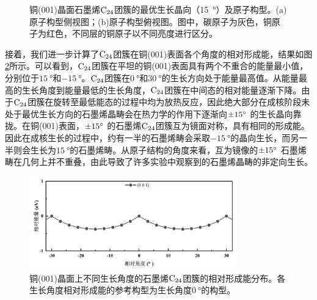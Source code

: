 \begin{figure}[htb]

    \caption{铜(001)晶面石墨烯$\rm{C_{24}}$团簇的最优生长晶向（\SI{15}{\degree}）及原子构型。(a)原子构型侧视图；(b)原子构型俯视图。图中，碳原子为灰色，铜原子为红色，不同层的铜原子以不同亮度进行区分。}
    \label{fig:GO_001_15_structure}
\end{figure}

接着，我们进一步计算了$\rm{C_{24}}$团簇在铜(001)表面各个角度的相对形成能，结果如图\ref{fig:GO_001_energy}所示。可以看到，$\rm{C_{24}}$团簇在平坦的铜(001)表面具有两个不重合的能量最小值，分别位于$\SI{+15}{\degree}$和$\SI{-15}{\degree}$。$\rm{C_{24}}$团簇在$\SI{0}{\degree}$和$\SI{30}{\degree}$的生长方向处于能量最高值。从能量最高的生长角度到能量最低的生长角度，$\rm{C_{24}}$团簇在中间态的相对能量逐渐下降。由于$\rm{C_{24}}$团簇在旋转至最低能态的过程中均为放热反应，因此绝大部分在成核阶段未处于最优生长方向的石墨烯晶畴会在热力学的作用下逐渐向$\SI{\pm 15}{\degree}$ 的生长晶向靠拢。在铜(001)表面，$\SI{\pm 15}{\degree}$ 的石墨烯$\rm{C_{24}}$团簇互为镜面对称，具有相同的形成能。因此在成核生长的过程中，约有一半的石墨烯畴会采取$\SI{-15}{\degree}$的晶向生长，而另一半则会生长为$\SI{+15}{\degree}$的石墨烯畴。从原子结构的角度来看，互为镜像的$\SI{\pm 15}{\degree}$ 石墨烯畴在几何上并不重叠，由此导致了许多实验中观察到的石墨烯晶畴的非定向生长。

\begin{figure}[htb]
    \includegraphics[width=0.8\textwidth]{pic/GO_C24_flat_001_energy.png}

    \caption{铜(001)晶面上不同生长角度的石墨烯$\rm{C_{24}}$团簇的相对形成能分布。各生长角度相对形成能的参考构型为生长角度$\SI{0}{\degree}$的构型。
    }

    \label{fig:GO_001_energy}
\end{figure}

